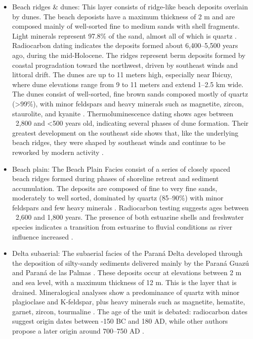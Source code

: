 \begin{itemize}
    \item Beach ridges \& dunes: This layer consists of ridge-like beach deposits overlain by dunes. The beach deposists have a maximum thickness of 2 m and are composed mainly of well-sorted fine to medium sands with shell fragments. Light minerals represent 97.8\% of the sand, almost all of which is quartz \autocite{rafaelcordiniContribucionConocimientoGeologia1949}. Radiocarbon dating indicates the deposits formed about 6,400–5,500 years ago, during the mid-Holocene. The ridges represent berm deposits formed by coastal progradation toward the northwest, driven by southeast winds and littoral drift.
    The dunes are up to 11 meters high, especially near Ibicuy, where dune elevations range from 9 to 11 meters and extend 1–2.5 km wide. The dunes consist of well-sorted, fine brown sands composed mostly of quartz (>99\%), with minor feldspars and heavy minerals such as magnetite, zircon, staurolite, and kyanite \autocite{rafaelcordiniContribucionConocimientoGeologia1949}. Thermoluminescence dating shows ages between ~2,800 and <500 years old, indicating several phases of dune formation. Their greatest development on the southeast side shows that, like the underlying beach ridges, they were shaped by southeast winds and continue to be reworked by modern activity \autocite{joseluiscavallottoEvolucionCambiosAmbientales2005}.

    \item Beach plain: The Beach Plain Facies consist of a series of closely spaced beach ridges formed during phases of shoreline retreat and sediment accumulation. The deposits are composed of fine to very fine sands, moderately to well sorted, dominated by quartz (85–90\%) with minor feldspars and few heavy minerals \autocite{rafaelcordiniContribucionConocimientoGeologia1949}. Radiocarbon testing suggests ages between ~2,600 and 1,800 years. The presence of both estuarine shells and freshwater species indicates a transition from estuarine to fluvial conditions as river influence increased \autocite{joseluiscavallottoEvolucionCambiosAmbientales2005}.

    \item Delta subaerial: The subaerial facies of the Paraná Delta developed through the deposition of silty-sandy sediments delivered mainly by the Paraná Guazú and Paraná de las Palmas \autocite{joseluiscavallottoEvolucionCambiosAmbientales2005}. These deposits occur at elevations between 2 m and sea level, with a maximum thickness of 12 m. This is the layer that is drained.
    Mineralogical analyses show a predominance of quartz with minor plagioclase and K-feldspar, plus heavy minerals such as magnetite, hematite, garnet, zircon, tourmaline \autocite{rafaelcordiniContribucionConocimientoGeologia1949}. The age of the unit is debated: radiocarbon dates suggest origin dates between -150 BC and 180 AD, while other authors propose a later origin around 700–750 AD \autocite{joseluiscavallottoEvolucionCambiosAmbientales2005}.
    

\end{itemize}
